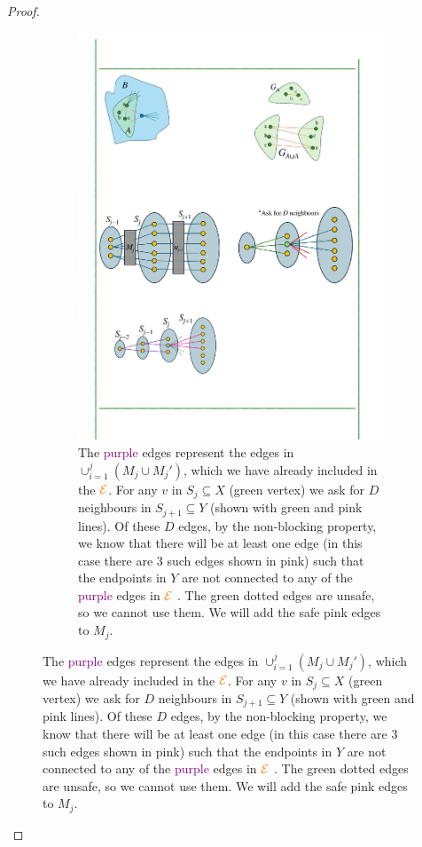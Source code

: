 \documentclass[11pt]{article}
\begin{document}
\begin{proof}
\begin{figure}[t!]
    \centering
    \begin{subfigure}[t]{0.95\textwidth}
        \centering
        \includegraphics{assets/embeddingA.pdf}
        \caption{The \textcolor{purple}{purple} edges represent the edges in $\cup_{i=1}^j (M_j \cup M_j')$, which we have already included in the $\textcolor{orange}{\mathcal{E}}$.
        For any $v$ in $S_j \subseteq X$ (\textcolor{cadmiumgreen}{green vertex}) we ask for $D$ neighbours in $S_{j+1} \subseteq Y$ (shown with \textcolor{cadmiumgreen}{green} and \textcolor{carminepink}{pink} lines). 
        Of these $D$ edges, by the non-blocking property, we know that there will be at least one edge (in this case there are 3 such edges shown in \textcolor{carminepink}{pink}) such that the endpoints in $Y$ are not connected to any of the \textcolor{purple}{purple} edges in $\textcolor{orange}{\mathcal{E}}$ . 
        The \textcolor{cadmiumgreen}{green} dotted edges are unsafe, so we cannot use them. We will add the safe \textcolor{carminepink}{pink} edges to $M_j$.}

\end{subfigure}
\end{figure}
\end{proof}
\end{document}
